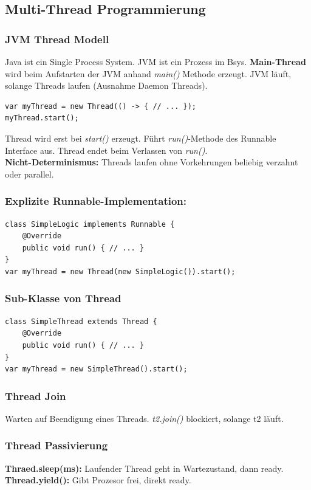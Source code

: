 \subsection{Multi-Thread Programmierung}
\subsubsection{JVM Thread Modell}
Java ist ein Single Process System. 
JVM ist ein Prozess im Bsys.
\textbf{Main-Thread} wird beim Aufstarten der JVM anhand \textit{main()} Methode erzeugt.
JVM läuft, solange Threads laufen (Ausnahme Daemon Threads).
\begin{lstlisting}
var myThread = new Thread(() -> { // ... });
myThread.start();
\end{lstlisting}
Thread wird erst bei \textit{start()} erzeugt. Führt \textit{run()}-Methode des Runnable Interface aus.
Thread endet beim Verlassen von \textit{run()}.\\
\textbf{Nicht-Determinismus:} Threads laufen ohne Vorkehrungen beliebig verzahnt oder parallel.
\subsubsection{Explizite Runnable-Implementation:}
\begin{lstlisting}
class SimpleLogic implements Runnable {
    @Override
    public void run() { // ... }
}
var myThread = new Thread(new SimpleLogic()).start();
\end{lstlisting}

\subsubsection{Sub-Klasse von Thread}
\begin{lstlisting}
class SimpleThread extends Thread {
    @Override 
    public void run() { // ... }
}
var myThread = new SimpleThread().start();
\end{lstlisting}

\subsubsection{Thread Join}
Warten auf Beendigung eines Threads. \textit{t2.join()} blockiert, solange t2 läuft.

\subsubsection{Thread Passivierung}
\textbf{Thraed.sleep(ms):} Laufender Thread geht in Wartezustand, dann ready.
\textbf{Thread.yield():} Gibt Prozesor frei, direkt ready.